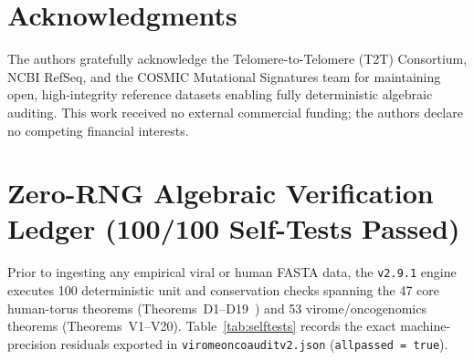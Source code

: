 \documentclass[11pt, a4paper]{article}
\DeclareRobustCommand{\_}{\textunderscore\allowbreak}
\begin{document}
\section*{Acknowledgments}

The authors gratefully acknowledge the Telomere-to-Telomere (T2T) Consortium, NCBI RefSeq, and the COSMIC Mutational Signatures team for maintaining open, high-integrity reference datasets enabling fully deterministic algebraic auditing. This work received no external commercial funding; the authors declare no competing financial interests.

\clearpage
\appendix
\section{Zero-RNG Algebraic Verification Ledger (100/100 Self-Tests Passed)}
\label{app:selftests}

Prior to ingesting any empirical viral or human FASTA data, the \texttt{v2.9.1} engine executes 100 deterministic unit and conservation checks spanning the 47 core human-torus theorems (Theorems~D1--D19~\cite{logvinovich2026_t2t}) and 53 virome/oncogenomics theorems (Theorems~V1--V20). Table~\ref{tab:selftests} records the exact machine-precision residuals exported in \texttt{virome\_onco\_audit\_v2.json} (\texttt{all\_passed = true}).
\end{document}
